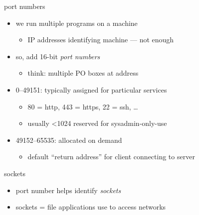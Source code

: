 \begin{frame}{port numbers}
    \begin{itemize}
    \item we run multiple programs on a machine
        \begin{itemize}
        \item IP addresses identifying machine --- not enough
        \end{itemize}
    \item<2-> so, add 16-bit \textit{port numbers}
        \begin{itemize}
        \item<2-> think: multiple PO boxes at address
        \end{itemize}
    \vspace{.5cm}
    \item<3-> 0--49151: typically assigned for particular services
        \begin{itemize}
        \item 80 = http, 443 = https, 22 = ssh, \ldots
        \item usually <1024 reserved for sysadmin-only-use
        \end{itemize}
    \item<3-> 49152--65535: allocated on demand
        \begin{itemize}
        \item default ``return address'' for client connecting to server
        \end{itemize}
    \end{itemize}
\end{frame}

\begin{frame}{sockets}
    \begin{itemize}
    \item port number helps identify \textit{sockets}
    \item sockets = file applications use to access networks
    \end{itemize}
\end{frame}

